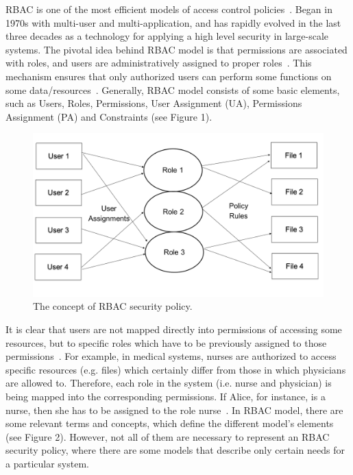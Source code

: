 RBAC is one of the most efficient models of access control policies~\cite{AhHu2007}.  Began in 1970s with multi-user and multi-application, and has rapidly evolved in the last three decades as a technology for applying a high level security in large-scale systems.  The pivotal idea behind RBAC model is that permissions are associated with roles, and users are administratively assigned to proper roles~\cite{Zha2008}. This mechanism ensures that only authorized users can perform some functions on some data/resources~\cite{FeKu2009}. Generally, RBAC model consists of some basic elements, such as Users, Roles, Permissions, User Assignment (UA), Permissions Assignment (PA) and Constraints (see Figure 1).

\begin{figure}[bht]
\centering
\includegraphics[scale=0.26]{RBACpolicy.png}
\caption{The concept of RBAC security policy.}
\label{fig:RBACPol}
\end{figure}


It is clear that users are not mapped directly into permissions of accessing some resources, but to specific roles which have to be previously assigned to those permissions~\cite{YuBr2012}.  For example, in medical systems, nurses are authorized to access specific resources (e.g. files) which certainly differ from those in which physicians are allowed to.  Therefore, each role in the system (i.e. nurse and physician) is being mapped into the corresponding permissions.  If Alice, for instance, is a nurse, then she has to be assigned to the role nurse~\cite{DBS2004}. 
      In RBAC model, there are some relevant terms and concepts, which define the different model’s elements~\cite{SDAG2008} (see Figure 2).  However, not all of them are necessary to represent an RBAC security policy, where there are some models that describe only certain needs for a particular system.

